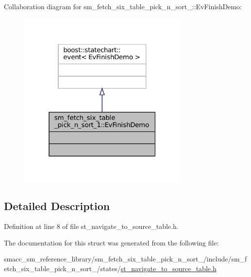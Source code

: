 Collaboration diagram for sm\+\_\+fetch\+\_\+six\+\_\+table\+\_\+pick\+\_\+n\+\_\+sort\+\_\+:\+:Ev\+Finish\+Demo\+:
\nopagebreak
\begin{figure}[H]
\begin{center}
\leavevmode
\includegraphics[width=244pt]{structsm__fetch__six__table__pick__n__sort__1_1_1EvFinishDemo__coll__graph}
\end{center}
\end{figure}


\subsection{Detailed Description}


Definition at line 8 of file st\+\_\+navigate\+\_\+to\+\_\+source\+\_\+table.\+h.



The documentation for this struct was generated from the following file\+:\begin{DoxyCompactItemize}
\item 
smacc\+\_\+sm\+\_\+reference\+\_\+library/sm\+\_\+fetch\+\_\+six\+\_\+table\+\_\+pick\+\_\+n\+\_\+sort\+\_/include/sm\+\_\+fetch\+\_\+six\+\_\+table\+\_\+pick\+\_\+n\+\_\+sort\+\_/states/\hyperlink{sm__fetch__six__table__pick__n__sort__1_2include_2sm__fetch__six__table__pick__n__sort__1_2state5e020896f3ab621d0e3d8db08e2ec8ea}{st\+\_\+navigate\+\_\+to\+\_\+source\+\_\+table.\+h}\end{DoxyCompactItemize}
